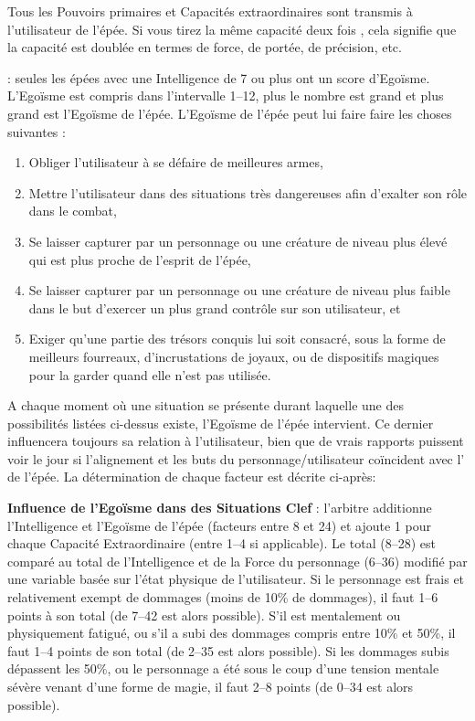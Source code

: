 {\medskip

Tous les Pouvoirs primaires et Capacités extraordinaires sont transmis à l'utilisateur de l'épée. Si vous tirez la même capacité deux fois , cela signifie que la capacité est doublée en termes de force, de portée, de précision, etc.

\bigskip

 : seules les épées avec une Intelligence de 7 ou plus ont un score d'Egoïsme. L'Egoïsme est compris dans l'intervalle 1--12, plus le nombre est grand et plus grand est l'Egoïsme de l'épée. L'Egoïsme de l'épée peut lui faire faire les choses suivantes :

\begin{enumerate}
\item Obliger l'utilisateur à se défaire de meilleures armes,
\item Mettre l'utilisateur dans des situations très dangereuses afin d'exalter son rôle dans le combat,
\item Se laisser capturer par un personnage ou une créature de niveau plus élevé qui est plus proche de l'esprit de l'épée,
\item Se laisser capturer par un personnage ou une créature de niveau plus faible dans le but d'exercer un plus grand contrôle sur son utilisateur, et
\item Exiger qu'une partie des trésors conquis lui soit consacré, sous la forme de meilleurs fourreaux, d'incrustations de joyaux, ou de dispositifs magiques pour la garder quand elle n'est pas utilisée.
\end{enumerate}

A chaque moment où une situation se présente durant laquelle une des possibilités listées ci-dessus existe, l'Egoïsme de l'épée intervient. Ce dernier influencera toujours sa relation à l'utilisateur, bien que de vrais rapports puissent voir le jour si l'alignement et les buts du personnage/utilisateur coïncident avec l' de l'épée. La détermination de chaque facteur est décrite ci-après:

\begin{center}
\begin{minipage}{0.8\linewidth}
\textbf{Influence de l'Egoïsme dans des Situations Clef} : l'arbitre additionne l'Intelligence et l'Egoïsme de l'épée (facteurs entre 8 et 24) et ajoute 1 pour chaque Capacité Extraordinaire (entre 1--4 si applicable). Le total (8--28) est comparé au total de l'Intelligence et de la Force du personnage (6--36) modifié par une variable basée sur l'état physique de l'utilisateur. Si le personnage est frais et relativement exempt de dommages (moins de 10\% de dommages), il faut  1--6 points à son total (de 7--42 est alors possible). S'il est mentalement ou physiquement fatigué, ou s'il a subi des dommages compris entre 10\% et 50\%, il faut  1--4 points de son total (de 2--35 est alors possible). Si les dommages subis dépassent les 50\%, ou le personnage a été sous le coup d'une tension mentale sévère venant d'une forme de magie, il faut  2--8 points (de 0--34 est alors possible).


\end{minipage}
\end{center}}
